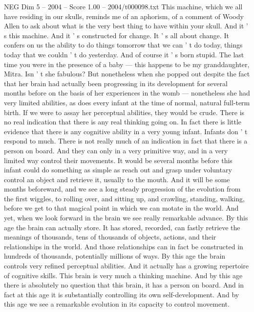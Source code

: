 \begin{textsample}{NEG Dim 5 – 2004 – Score 1.00 – 2004/t000098.txt}  \label{ex:f5_neg_065}
This machine, which we all have residing in our skulls, reminds me of an aphorism, of a comment of Woody Allen to ask about what is the very best thing to have within your skull.
And it ' s this machine.
And it ' s constructed for change.
It ' s all about change.
It confers on us the ability to do things tomorrow that we can ' t do today, things today that we couldn ' t do yesterday.
And of course it ' s born stupid.
The last time you were in the presence of a baby — this happens to be my granddaughter, Mitra.
Isn ' t she fabulous?
But nonetheless when she popped out despite the fact that her brain had actually been progressing in its development for several months before on the basis of her experiences in the womb — nonetheless she had very limited abilities, as does every infant at the time of normal, natural full-term birth.
If we were to assay her perceptual abilities, they would be crude.
There is no real indication that there is any real thinking going on.
In fact there is little evidence that there is any cognitive ability in a very young infant.
Infants don ' t respond to much.
There is not really much of an indication in fact that there is a person on board.
And they can only in a very primitive way, and in a very limited way control their movements.
It would be several months before this infant could do something as simple as reach out and grasp under voluntary control an object and retrieve it, usually to the mouth.
And it will be some months beforeward, and we see a long steady progression of the evolution from the first wiggles, to rolling over, and sitting up, and crawling, standing, walking, before we get to that magical point in which we can motate in the world.
And yet, when we look forward in the brain we see really remarkable advance.
By this age the brain can actually store.
It has stored, recorded, can fastly retrieve the meanings of thousands, tens of thousands of objects, actions, and their relationships in the world.
And those relationships can in fact be constructed in hundreds of thousands, potentially millions of ways.
By this age the brain controls very refined perceptual abilities.
And it actually has a growing repertoire of cognitive skills.
This brain is very much a thinking machine.
And by this age there is absolutely no question that this brain, it has a person on board.
And in fact at this age it is substantially controlling its own self-development.
And by this age we see a remarkable evolution in its capacity to control movement.

\end{textsample}

